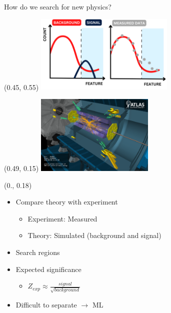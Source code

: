 \documentclass[UKenglish]{beamer}
\begin{document}
\begin{frame}{How do we search for new physics?}

    \begin{textblock}{1}(0.45, 0.55)
        \includegraphics[width = 0.5\textwidth]{figures/DataCompHalf.png}
    \end{textblock}
    \begin{textblock}{1}(0.49, 0.15)
        \includegraphics[width = 0.425\textwidth]{figures/vp1_3dcocktail_run264034_evt11526514_2015-05-06T22-54-50_2}
    \end{textblock}
    \begin{textblock}{0.45}(0., 0.18)
        \begin{itemize}
            \item Compare theory with experiment 
            \begin{itemize}
                \item Experiment: Measured
                \item Theory: Simulated (background and signal)
            \end{itemize}
            \item Search regions
            \item Expected significance
            \begin{itemize}
                \item $Z_{exp}\approx \frac{signal}{\sqrt{background}}$
            \end{itemize}
            \item Difficult to separate $\rightarrow$ ML
        \end{itemize}
    \end{textblock}
\end{frame}
\end{document}

